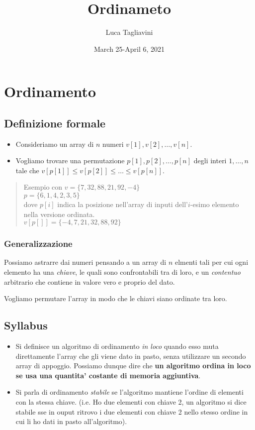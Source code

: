 \documentclass{article}
\title{\textbf{Ordinameto}}
\author{Luca Tagliavini}
\date{March 25-April 6, 2021}
\begin{document}
\maketitle
\tableofcontents
\pagebreak

\section{Ordinamento}
\subsection{Definizione formale}

\begin{itemize}
  \item Consideriamo un array di $n$ numeri $v[1], v[2], \ldots, v[n]$.
  \item Vogliamo trovare una permutazione $p[1], p[2], \ldots, p[n]$ degli interi
    $1, \ldots, n$ tale che $v[p[1]] \leq v[p[2]] \leq \ldots \leq v[p[n]]$.
\end{itemize}
\begin{quote}
  Esempio con $v = \{7,32,88,21,92,-4\}$ \\
  $p = \{6,1,4,2,3,5\}$ \\
  dove $p[i]$ indica la posizione nell'array di inputi dell'$i$-esimo
  elemento nella versione ordinata. \\
  $v[p[]] = \{-4,7,21,32,88,92\}$
\end{quote}

\subsubsection{Generalizzazione}

Possiamo astrarre dai numeri pensando a un array di $n$ elmenti tali per cui
ogni elemento ha una \emph{chiave}, le quali sono confrontabili tra di loro, e un
\emph{contentuo} arbitrario che contiene in valore vero e proprio del dato.

Vogliamo permutare l'array in modo che le chiavi siano ordinate tra loro.

\subsection{Syllabus}

\begin{itemize}
  \item Si definisce un algoritmo di ordinamento \emph{in loco} quando esso muta
  direttamente l'array che gli viene dato in pasto, senza utilizzare un secondo
  array di appoggio. Possiamo dunque dire che \textbf{un algoritmo ordina in loco
  se usa una quantita' costante di memoria aggiuntiva}.

  \item Si parla di ordinamento \emph{stabile} se l'algoritmo mantiene l'ordine
    di elementi con la stessa chiave. (i.e. Ho due elementi con chiave 2, un
    algoritmo si dice stabile sse in ouput ritrovo i due elementi con chiave 2
    nello stesso ordine in cui li ho dati in pasto all'algoritmo).
\end{itemize}
\end{document}
